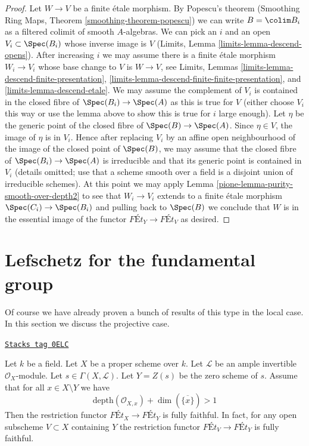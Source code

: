 \begin{proof}
\medskip\noindent
Let $W \to V$ be a finite \'etale morphism.
By Popescu's theorem
(Smoothing Ring Maps, Theorem \ref{smoothing-theorem-popescu})
we can write $B = \colim B_i$ as a filtered colimit
of smooth $A$-algebras. We can pick an $i$ and an
open $V_i \subset \Spec(B_i)$ whose inverse image is $V$
(Limits, Lemma \ref{limits-lemma-descend-opens}).
After increasing $i$ we may assume there is a finite
\'etale morphism $W_i \to V_i$ whose base change to $V$
is $W \to V$, see
Limits, Lemmas \ref{limits-lemma-descend-finite-presentation},
\ref{limits-lemma-descend-finite-finite-presentation}, and
\ref{limits-lemma-descend-etale}.
We may assume the complement of $V_i$ is contained
in the closed fibre of $\Spec(B_i) \to \Spec(A)$ as this
is true for $V$ (either choose $V_i$ this way or use
the lemma above to show this is true for $i$ large enough).
Let $\eta$ be the generic point of the closed fibre
of $\Spec(B) \to \Spec(A)$. Since $\eta \in V$, the image of
$\eta$ is in $V_i$. Hence after replacing $V_i$ by an
affine open neighbourhood of the image of the closed point
of $\Spec(B)$, we may assume that the closed fibre
of $\Spec(B_i) \to \Spec(A)$ is irreducible and that
its generic point is contained in $V_i$ (details omitted; use that
a scheme smooth over a field is a disjoint union of irreducible schemes).
At this point we may apply Lemma \ref{pione-lemma-purity-smooth-over-depth2}
to see that $W_i \to V_i$ extends to a finite \'etale
morphism $\Spec(C_i) \to \Spec(B_i)$ and pulling
back to $\Spec(B)$ we conclude that $W$ is in
the essential image of the functor
$\textit{F\'Et}_Y \to \textit{F\'Et}_V$
as desired.
\end{proof}

\section{Lefschetz for the fundamental group}
\label{pione-section-global-lefschetz}
Of course we have already proven a bunch of results of this type
in the local case. In this section we discuss the projective case.

\begin{proposition}
\label{pione-proposition-lefschetz-fully-faithful}
\href{https://stacks.math.columbia.edu/tag/0ELC}{\texttt{Stacks tag 0ELC}}

Let $k$ be a field. Let $X$ be a proper scheme over $k$.
Let $\mathcal{L}$ be an ample invertible $\mathcal{O}_X$-module.
Let $s \in \Gamma(X, \mathcal{L})$. Let $Y = Z(s)$ be the
zero scheme of $s$. Assume that for all $x \in X \setminus Y$
we have
$$
\text{depth}(\mathcal{O}_{X, x}) + \dim(\overline{\{x\}}) > 1
$$
Then the restriction functor $\textit{F\'Et}_X \to \textit{F\'Et}_Y$
is fully faithful. In fact, for any open subscheme $V \subset X$
containing $Y$ the restriction functor
$\textit{F\'Et}_V \to \textit{F\'Et}_Y$
is fully faithful.
\end{proposition}

